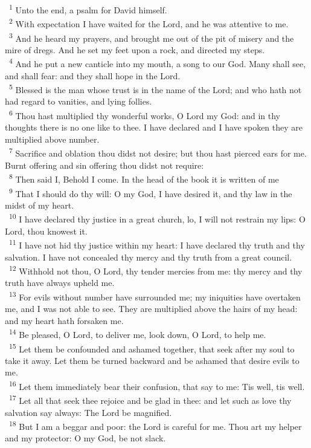 \documentclass[a5paper,12pt]{article}
\begin{document}
\begin{multicols*}{2}
~\textsuperscript{1} Unto the end, a psalm for David himself.\\
~\textsuperscript{2} With expectation I have waited for the Lord, and he was attentive to me.\\
~\textsuperscript{3} And he heard my prayers, and brought me out of the pit of misery and the mire of dregs. And he set my feet upon a rock, and directed my steps.\\
~\textsuperscript{4} And he put a new canticle into my mouth, a song to our God. Many shall see, and shall fear: and they shall hope in the Lord.\\
~\textsuperscript{5} Blessed is the man whose trust is in the name of the Lord; and who hath not had regard to vanities, and lying follies.\\
~\textsuperscript{6} Thou hast multiplied thy wonderful works, O Lord my God: and in thy thoughts there is no one like to thee. I have declared and I have spoken they are multiplied above number.\\
~\textsuperscript{7} Sacrifice and oblation thou didst not desire; but thou hast pierced ears for me. Burnt offering and sin offering thou didst not require:\\
~\textsuperscript{8} Then said I, Behold I come. In the head of the book it is written of me\\
~\textsuperscript{9} That I should do thy will: O my God, I have desired it, and thy law in the midst of my heart.\\
~\textsuperscript{10} I have declared thy justice in a great church, lo, I will not restrain my lips: O Lord, thou knowest it.\\
~\textsuperscript{11} I have not hid thy justice within my heart: I have declared thy truth and thy salvation. I have not concealed thy mercy and thy truth from a great council.\\
~\textsuperscript{12} Withhold not thou, O Lord, thy tender mercies from me: thy mercy and thy truth have always upheld me.\\
~\textsuperscript{13} For evils without number have surrounded me; my iniquities have overtaken me, and I was not able to see. They are multiplied above the hairs of my head: and my heart hath forsaken me.\\
~\textsuperscript{14} Be pleased, O Lord, to deliver me, look down, O Lord, to help me.\\
~\textsuperscript{15} Let them be confounded and ashamed together, that seek after my soul to take it away. Let them be turned backward and be ashamed that desire evils to me.\\
~\textsuperscript{16} Let them immediately bear their confusion, that say to me: Tis well, tis well.\\
~\textsuperscript{17} Let all that seek thee rejoice and be glad in thee: and let such as love thy salvation say always: The Lord be magnified.\\
~\textsuperscript{18} But I am a beggar and poor: the Lord is careful for me. Thou art my helper and my protector: O my God, be not slack.\\


\end{multicols*}
\end{document}
